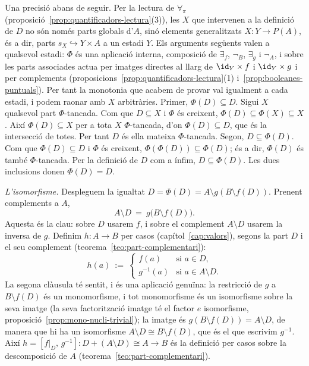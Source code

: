 \begin{prova}
Una precisió abans de seguir. Per la lectura de \(\forall_\pi\)
(proposició~\ref{prop:quantificadors-lectura}(3)), les \(X\) que intervenen a
la definició de \(D\) no són només parts globals d'\(A\), sinó elements
generalitzats \(X\colon Y\to P(A)\), és a dir, parts \(s_X\hookrightarrow
Y\times A\) a un estadi \(Y\). Els arguments següents valen a qualsevol estadi:
\(\Phi\) és una aplicació interna, composició de \(\exists_f\), \(\neg_B\),
\(\exists_g\) i \(\neg_A\), i sobre les parts associades actua per imatges
directes al llarg de \(\id_Y\times f\) i \(\id_Y\times g\) i per complements
(proposicions~\ref{prop:quantificadors-lectura}(1)
i~\ref{prop:booleanes-puntuals}). Per tant la monotonia que acabem de
provar val igualment a cada estadi, i podem raonar amb \(X\) arbitràries.
Primer, \(\Phi(D)\subseteq D\). Sigui \(X\) qualsevol part
\(\Phi\)-tancada. Com que \(D\subseteq X\) i \(\Phi\) és creixent,
\(\Phi(D)\subseteq\Phi(X)\subseteq X\). Així \(\Phi(D)\subseteq X\) per a
tota \(X\) \(\Phi\)-tancada, d'on \(\Phi(D)\subseteq D\), que és la
intersecció de totes. Per tant \(D\) és ella mateixa \(\Phi\)-tancada.
Segon, \(D\subseteq\Phi(D)\). Com que \(\Phi(D)\subseteq D\) i \(\Phi\) és
creixent, \(\Phi(\Phi(D))\subseteq\Phi(D)\); és a dir, \(\Phi(D)\) és també
\(\Phi\)-tancada. Per la definició de \(D\) com a ínfim, \(D\subseteq
\Phi(D)\). Les dues inclusions donen \(\Phi(D)=D\).

\emph{L'isomorfisme.} Despleguem la igualtat \(D=\Phi(D)=A\setminus
g(B\setminus f(D))\). Prenent complements a \(A\),
\[
A\setminus D\ =\ g\bigl(B\setminus f(D)\bigr).
\]
Aquesta és la clau: sobre \(D\) usarem \(f\), i sobre el complement
\(A\setminus D\) usarem la inversa de \(g\). Definim
\(h\colon A\to B\) per casos (capítol~\ref{cap:valors}), segons la
part \(D\) i el seu complement (teorema~\ref{teo:part-complementari}):
\[
h(a)\ :=\
\begin{cases}
f(a) & \text{si } a\in D,\\[1mm]
g^{-1}(a) & \text{si } a\in A\setminus D.
\end{cases}
\]
La segona clàusula té sentit, i és una aplicació genuïna: la
restricció de \(g\) a \(B\setminus f(D)\) és un monomorfisme, i tot
monomorfisme és un isomorfisme sobre la seva imatge (la seva factorització
imatge té el factor \(e\) isomorfisme, proposició~\ref{prop:mono-nucli-trivial});
la imatge és \(g(B\setminus f(D))=A\setminus D\), de manera que hi ha un
isomorfisme \(A\setminus D\cong B\setminus f(D)\), que és el que escrivim
\(g^{-1}\). Així \(h=[f|_D,\,g^{-1}]\colon D+(A\setminus D)\cong A\to B\) és la
definició per casos sobre la descomposició de \(A\)
(teorema~\ref{teo:part-complementari}).


\end{prova}
